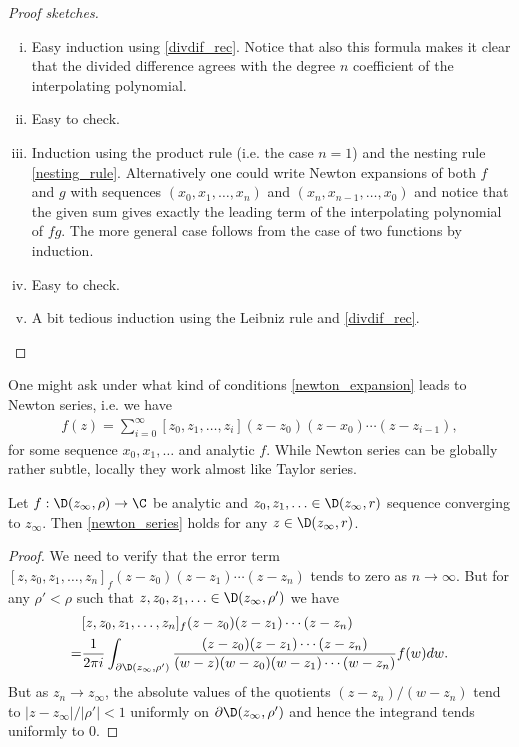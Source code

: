 \begin{proof}[Proof sketches]
	\begin{enumerate}[(i)]
		\item Easy induction using \ref{divdif_rec}. Notice that also this formula makes it clear that the divided difference agrees with the degree $n$ coefficient of the interpolating polynomial.
		\item Easy to check.
		\item Induction using the product rule (i.e. the case $n = 1$) and the nesting rule \ref{nesting_rule}. Alternatively one could write Newton expansions of both $f$ and $g$ with sequences $(x_{0}, x_{1}, \ldots, x_{n})$ and $(x_{n}, x_{n - 1}, \ldots, x_{0})$ and notice that the given sum gives exactly the leading term of the interpolating polynomial of $f g$. The more general case follows from the case of two functions by induction.
		\item Easy to check.
		\item A bit tedious induction using the Leibniz rule and \ref{divdif_rec}.
	\end{enumerate}
\end{proof}

One might ask under what kind of conditions \ref{newton_expansion} leads to Newton series, i.e. we have
\begin{align}\label{newton_series}
	f(z) = \sum_{i = 0}^{\infty} [z_{0}, z_{1}, \ldots, z_{i}] (z - z_{0}) (z - x_{0}) \cdots (z - z_{i - 1}),
\end{align}
for some sequence $x_{0}, x_{1}, \ldots$ and analytic $f$. While Newton series can be globally rather subtle, locally they work almost like Taylor series.

\begin{prop}
	Let $f : \D(z_{\infty}, \rho) \to \C$ be analytic and $z_{0}, z_{1}, \ldots \in \D(z_{\infty}, r)$ sequence converging to $z_{\infty}$. Then \ref{newton_series} holds for any $z \in \D(z_{\infty}, r)$.
\end{prop}
\begin{proof}
	We need to verify that the error term $[z, z_{0}, z_{1}, \ldots, z_{n}]_{f} (z - z_{0}) (z - z_{1}) \cdots (z - z_{n})$ tends to zero as $n \to \infty$. But for any $\rho' < \rho$ such that $z, z_{0}, z_{1}, \ldots \in \D(z_{\infty}, \rho')$ we have
	\begin{align*}
		&[z, z_{0}, z_{1}, \ldots, z_{n}]_{f} (z - z_{0}) (z - z_{1}) \cdots (z - z_{n}) \\
		= & \frac{1}{2 \pi i} \int_{\partial \D(z_{\infty}, \rho')} \frac{(z - z_{0}) (z - z_{1}) \cdots (z - z_{n})}{(w - z)(w - z_{0}) (w - z_{1}) \cdots (w - z_{n})} f(w) dw.
	\end{align*}
	But as $z_{n} \to z_{\infty}$, the absolute values of the quotients $(z - z_{n})/(w - z_{n})$ tend to $|z - z_{\infty}|/|\rho'| < 1$ uniformly on $\partial \D(z_{\infty}, \rho')$ and hence the integrand tends uniformly to $0$.
\end{proof}

